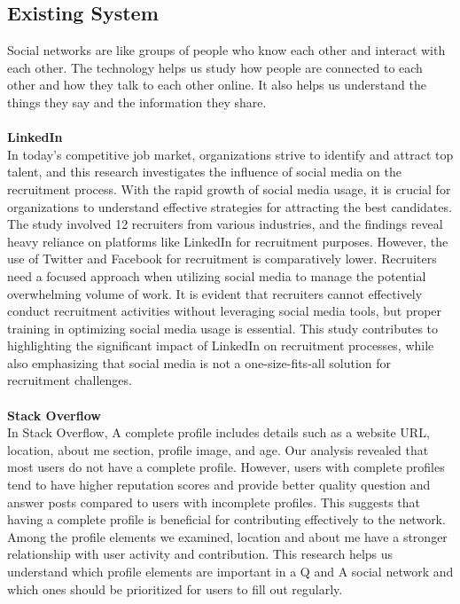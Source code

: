 \subsection{Existing System}
Social networks are like groups of people who know each other and interact with each other. The technology helps us study how people are connected to each other and how they talk to each other online. It also helps us understand the things they say and the information they share.\cite{korshunov2014social}\\\\
\textbf{LinkedIn}\\
In today's competitive job market, organizations strive to identify and attract top talent, and this research investigates the influence of social media on the recruitment process. With the rapid growth of social media usage, it is crucial for organizations to understand effective strategies for attracting the best candidates. The study involved 12 recruiters from various industries, and the findings reveal heavy reliance on platforms like LinkedIn for recruitment purposes. However, the use of Twitter and Facebook for recruitment is comparatively lower. Recruiters need a focused approach when utilizing social media to manage the potential overwhelming volume of work. It is evident that recruiters cannot effectively conduct recruitment activities without leveraging social media tools, but proper training in optimizing social media usage is essential. This study contributes to highlighting the significant impact of LinkedIn on recruitment processes, while also emphasizing that social media is not a one-size-fits-all solution for recruitment challenges.\cite{koch2018impact}\\\\
\textbf{Stack Overflow}\\
In Stack Overflow, A complete profile includes details such as a website URL, location, about me section, profile image, and age. Our analysis revealed that most users do not have a complete profile. However, users with complete profiles tend to have higher reputation scores and provide better quality question and answer posts compared to users with incomplete profiles. This suggests that having a complete profile is beneficial for contributing effectively to the network. Among the profile elements we examined, location and about me have a stronger relationship with user activity and contribution. This research helps us understand which profile elements are important in a Q and A social network and which ones should be prioritized for users to fill out regularly.\cite{adaji2016towards}\\\\
